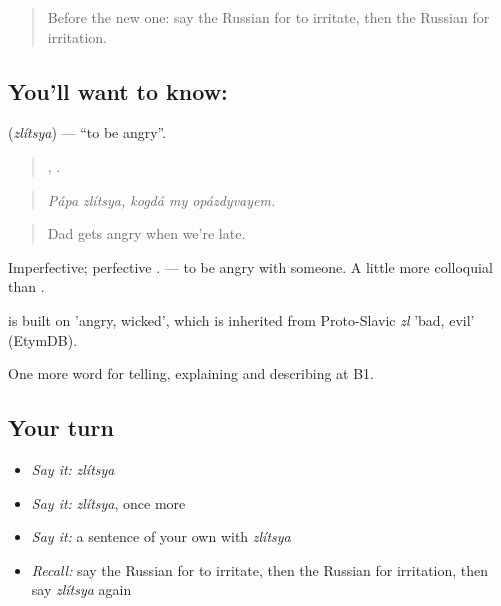 \label{lesson:RU-C472-zlitsya}



\begin{quote}
Before the new one: say the Russian for to irritate, then the Russian for irritation.
\end{quote}

\subsection*{You'll want to know: }
\textbf{} (\emph{zlítsya}) — \textquotedblleft{}to be angry\textquotedblright{}.

\begin{quote}
 ,   .
\end{quote}

\begin{quote}
\emph{Pápa zlítsya, kogdá my opázdyvayem.}
\end{quote}

\begin{quote}
Dad gets angry when we're late.
\end{quote}

Imperfective; perfective . \emph{  } — to be angry with someone. A little more colloquial than \emph{}.

\begin{cousinweb}
\emph{} is built on \emph{} 'angry, wicked', which is inherited from Proto-Slavic \emph{zl} 'bad, evil' (EtymDB).
\end{cousinweb}

\begin{grammarlens}[title={What you've built}]
One more word for telling, explaining and describing at B1.
\end{grammarlens}

\subsection*{Your turn}
\begin{itemize}
\raggedright
  \item \emph{Say it:} \emph{zlítsya}
  \item \emph{Say it:} \emph{zlítsya}, once more
  \item \emph{Say it:} a sentence of your own with \emph{zlítsya}
  \item \emph{Recall:} say the Russian for to irritate, then the Russian for irritation, then say \emph{zlítsya} again
\end{itemize}


